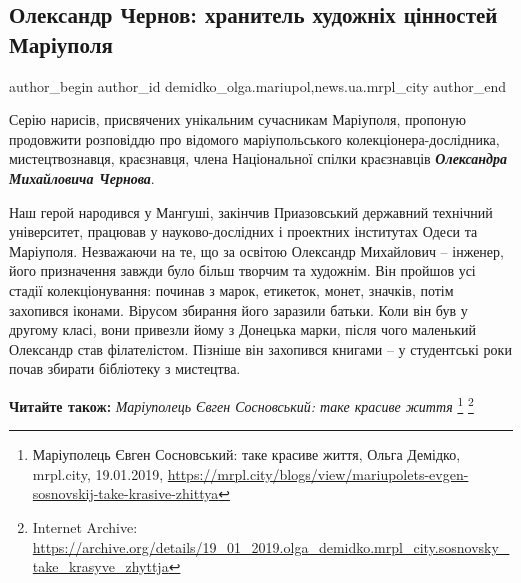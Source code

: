 
 
 
 
 
 
\subsection{Олександр Чернов: хранитель художніх цінностей Маріуполя}
\label{sec:12_02_2019.stz.news.ua.mrpl_city.1.oleksandr_chernov_hranytel_hud_cinnostej_mrpl}
 
\ifcmt
 author_begin
   author_id demidko_olga.mariupol,news.ua.mrpl_city
 author_end
\fi


Серію нарисів, присвячених унікальним сучасникам Маріуполя, пропоную продовжити
розповіддю про відомого маріупольського колекціонера-дослідника,
мистецтвознавця, краєзнавця, члена Національної спілки краєзнавців \textbf{\emph{Олександра
Михайловича Чернова}}.

Наш герой народився у Мангуші, закінчив Приазовський державний технічний
університет, працював у науково-дослідних і проектних інститутах Одеси та
Маріуполя. Незважаючи на те, що за освітою Олександр Михайлович – інженер, його
призначення завжди було більш творчим та художнім. Він пройшов усі стадії
колекціонування: починав з марок, етикеток, монет, значків, потім захопився
іконами. Вірусом збирання його заразили батьки. Коли він був у другому класі,
вони привезли йому з Донецька марки, після чого маленький Олександр став
філателістом. Пізніше він захопився книгами – у студентські роки почав збирати
бібліотеку з мистецтва.

\textbf{Читайте також:} \emph{Маріуполець Євген Сосновський: таке красиве життя}%
\footnote{Маріуполець Євген Сосновський: таке красиве життя, Ольга Демідко, mrpl.city, 19.01.2019, \url{https://mrpl.city/blogs/view/mariupolets-evgen-sosnovskij-take-krasive-zhittya}} %
\footnote{Internet Archive: \url{https://archive.org/details/19_01_2019.olga_demidko.mrpl_city.sosnovsky_take_krasyve_zhyttja}}

